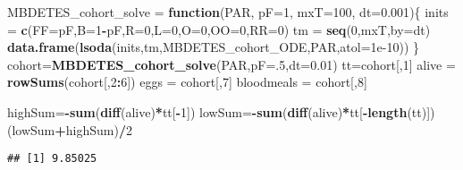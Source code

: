 \documentclass[]{article}
\newenvironment{Shaded}{\begin{snugshade}}{\end{snugshade}}
\newcommand{\ControlFlowTok}[1]{\textcolor[rgb]{0.13,0.29,0.53}{\textbf{#1}}}
\newcommand{\DataTypeTok}[1]{\textcolor[rgb]{0.13,0.29,0.53}{#1}}
\newcommand{\DecValTok}[1]{\textcolor[rgb]{0.00,0.00,0.81}{#1}}
\newcommand{\FloatTok}[1]{\textcolor[rgb]{0.00,0.00,0.81}{#1}}
\newcommand{\KeywordTok}[1]{\textcolor[rgb]{0.13,0.29,0.53}{\textbf{#1}}}
\newcommand{\NormalTok}[1]{#1}
\newcommand{\OperatorTok}[1]{\textcolor[rgb]{0.81,0.36,0.00}{\textbf{#1}}}
\newcommand{\StringTok}[1]{\textcolor[rgb]{0.31,0.60,0.02}{#1}}
\begin{document}
\begin{Shaded}
\begin{Highlighting}[]
\NormalTok{MBDETES_cohort_solve =}\StringTok{ }\ControlFlowTok{function}\NormalTok{(PAR, }\DataTypeTok{pF=}\DecValTok{1}\NormalTok{, }\DataTypeTok{mxT=}\DecValTok{100}\NormalTok{, }\DataTypeTok{dt=}\FloatTok{0.001}\NormalTok{)\{}
\NormalTok{  inits =}\StringTok{ }\KeywordTok{c}\NormalTok{(}\DataTypeTok{FF=}\NormalTok{pF,}\DataTypeTok{B=}\DecValTok{1}\OperatorTok{-}\NormalTok{pF,}\DataTypeTok{R=}\DecValTok{0}\NormalTok{,}\DataTypeTok{L=}\DecValTok{0}\NormalTok{,}\DataTypeTok{O=}\DecValTok{0}\NormalTok{,}\DataTypeTok{OO=}\DecValTok{0}\NormalTok{,}\DataTypeTok{RR=}\DecValTok{0}\NormalTok{)}
\NormalTok{  tm =}\StringTok{ }\KeywordTok{seq}\NormalTok{(}\DecValTok{0}\NormalTok{,mxT,}\DataTypeTok{by=}\NormalTok{dt)}
  \KeywordTok{data.frame}\NormalTok{(}\KeywordTok{lsoda}\NormalTok{(inits,tm,MBDETES_cohort_ODE,PAR,}\DataTypeTok{atol=}\FloatTok{1e-10}\NormalTok{))}
\NormalTok{\}}
\NormalTok{cohort=}\KeywordTok{MBDETES_cohort_solve}\NormalTok{(PAR,}\DataTypeTok{pF=}\NormalTok{.}\DecValTok{5}\NormalTok{,}\DataTypeTok{dt=}\FloatTok{0.01}\NormalTok{)}
\NormalTok{tt=cohort[,}\DecValTok{1}\NormalTok{]}
\NormalTok{alive =}\StringTok{ }\KeywordTok{rowSums}\NormalTok{(cohort[,}\DecValTok{2}\OperatorTok{:}\DecValTok{6}\NormalTok{])}
\NormalTok{eggs =}\StringTok{ }\NormalTok{cohort[,}\DecValTok{7}\NormalTok{]}
\NormalTok{bloodmeals =}\StringTok{ }\NormalTok{cohort[,}\DecValTok{8}\NormalTok{]}

\NormalTok{highSum=}\OperatorTok{-}\KeywordTok{sum}\NormalTok{(}\KeywordTok{diff}\NormalTok{(alive)}\OperatorTok{*}\NormalTok{tt[}\OperatorTok{-}\DecValTok{1}\NormalTok{])}
\NormalTok{lowSum=}\OperatorTok{-}\KeywordTok{sum}\NormalTok{(}\KeywordTok{diff}\NormalTok{(alive)}\OperatorTok{*}\NormalTok{tt[}\OperatorTok{-}\KeywordTok{length}\NormalTok{(tt)])}
\NormalTok{(lowSum}\OperatorTok{+}\NormalTok{highSum)}\OperatorTok{/}\DecValTok{2}
\end{Highlighting}
\end{Shaded}

\begin{verbatim}
## [1] 9.85025
\end{verbatim}
\end{document}
